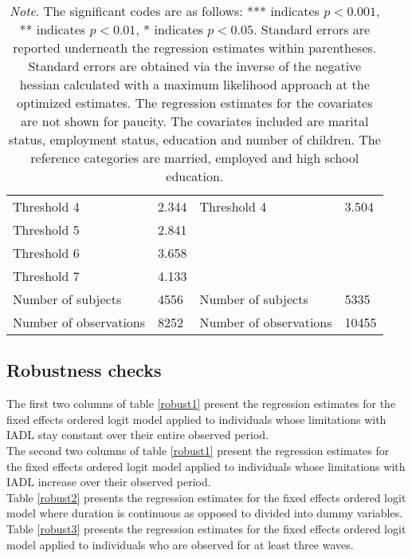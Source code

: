\documentclass[12pt]{article}
\begin{document}
\begin{table}[htbp]
\begin{tabular}{ll ll}
Threshold 4                 &  2.344            & Threshold 4                 & 3.504          \\
Threshold 5                 &  2.841            &                             &\\
Threshold 6                 &  3.658            &                             &\\
Threshold 7                 &  4.133            &                             &\\
Number of subjects          &  4556             & Number of subjects          & 5335\\
Number of observations      &  8252             & Number of observations      & 10455\\
\hline
\end{tabular}
\caption*{\footnotesize{\textit{Note}. The significant codes are as follows: *** indicates $p < 0.001$, ** indicates $p < 0.01$, * indicates $p <0.05$. Standard errors are reported underneath the regression estimates within parentheses. Standard errors are obtained via the inverse of the negative hessian calculated with a maximum likelihood approach at the optimized estimates. The regression estimates for the covariates are not shown for paucity. The covariates included are marital status, employment status, education and number of children. The reference categories are married, employed and high school education.}}
\end{table}

\FloatBarrier


\subsection{Robustness checks}

The first two columns of table \ref{robust1} present the regression estimates for the fixed effects ordered logit model applied to individuals whose limitations with IADL stay constant over their entire observed period.\\
The second two columns of table \ref{robust1} present the regression estimates for the fixed effects ordered logit model applied to individuals whose limitations with IADL increase over their observed period.\\
Table \ref{robust2} presents the regression estimates for the fixed effects ordered logit model where duration is continuous as opposed to divided into dummy variables.\\
Table \ref{robust3} presents the regression estimates for the fixed effects ordered logit model applied to individuals who are observed for at least three waves.\\
\end{document}
